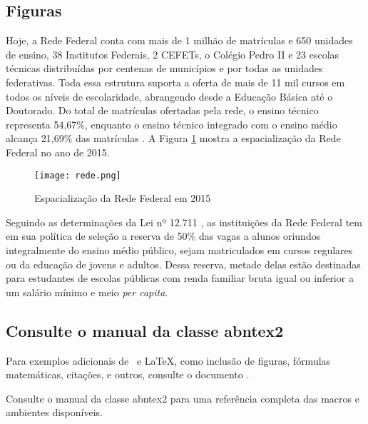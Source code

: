 \subsection{Figuras}

Hoje, a Rede Federal conta com mais de 1 milhão de matrículas e 650 unidades de ensino, 38 Institutos Federais, 2 CEFETs, o Colégio Pedro II e 23 escolas técnicas distribuídas por centenas de municípios e por todas as unidades federativas. Toda essa estrutura suporta a oferta de mais de 11 mil cursos em todos os níveis de escolaridade, abrangendo desde a Educação Básica até o Doutorado. Do total de matrículas ofertadas pela rede, o ensino técnico representa 54,67\%, enquanto o ensino técnico integrado com o ensino médio alcança 21,69\% das matrículas \cite{PlataformaNiloPecanha2018}. A Figura \ref{fig:rede} mostra a espacialização da Rede Federal no ano de 2015.

\begin{figure}[h]
	\centering
	\caption{Espacialização da Rede Federal em 2015}
	\texttt{[image: rede.png]}
	\label{fig:rede}
\end{figure}

Seguindo as determinações da Lei nº 12.711 \cite{Lei12711}, as instituições da Rede Federal tem em sua política de seleção a reserva de 50\% das vagas a alunos oriundos integralmente do ensino médio público, sejam matriculados em cursos regulares ou da educação de jovens e adultos. Dessa reserva, metade delas estão destinadas para estudantes de escolas públicas com renda familiar bruta igual ou inferior a um salário mínimo e meio \textit{per capita}.

\subsection{Consulte o manual da classe \textsf{abntex2}}

Para exemplos adicionais de \abnTeX\ e \LaTeX, como inclusão de figuras,
fórmulas matemáticas, citações, e outros, consulte o documento
.

Consulte o manual da classe \textsf{abntex2} \cite{abntex2classe} para uma
referência completa das macros e ambientes disponíveis.